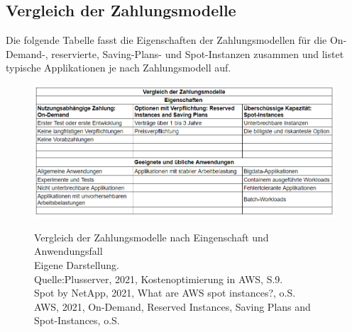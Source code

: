 \subsection*{Vergleich der Zahlungsmodelle}
Die folgende Tabelle fasst die Eigenschaften der Zahlungsmodellen für die On-Demand-, reservierte, Saving-Plans- und Spot-Instanzen zusammen und listet typische Applikationen je nach Zahlungsmodell auf.
\begin{figure}[h!]
    \centering
    \includegraphics[scale=0.63]{sources/Vergleich_der_Zahlungsmodelle}\label{fig:Vergleich_der_Zahlungsmodelle}\\
    \caption[Vergleich der Zahlungsmodelle]{}
    \label{fig:Vergleich_der_Zahlungsmodelle}  Vergleich der Zahlungsmodelle nach Eingenschaft und Anwendungsfall\\
Eigene Darstellung. \\
Quelle:Plusserver, 2021, Kostenoptimierung in AWS, S.9.\cite{PS1}\\
Spot by NetApp, 2021, What are AWS spot instances?, o.S.\cite{SPOT1}\\
AWS, 2021, On-Demand, Reserved Instances, Saving Plans and Spot-Instances, o.S.\cite{AMZ02, AMZ07, AMZ11, AMZ19}
  \end{figure}
%

\newpage
